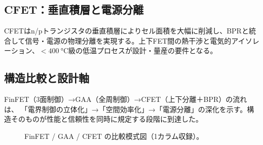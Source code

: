 \subsection{CFET：垂直積層と電源分離}
CFETはn/pトランジスタの垂直積層によりセル面積を大幅に削減し、BPRと統合して信号・電源の物理分離を実現する。上下FET間の熱干渉と電気的アイソレーション、$\!<\!\SI{400}{\celsius}$級の低温プロセスが設計・量産の要件となる。

\subsection{構造比較と設計軸}
FinFET（3面制御）→GAA（全周制御）→CFET（上下分離＋BPR）の流れは、
「電界制御の立体化」→「空間効率化」→「電源分離」の深化を示す。構造そのものが性能と信頼性を同時に規定する段階に到達した。

\begin{figure}[!t]
  \centering
  
  \caption{FinFET / GAA / CFET の比較模式図（1カラム収録）。}
  \label{fig:structure_compare_in_ch2}
\end{figure}
